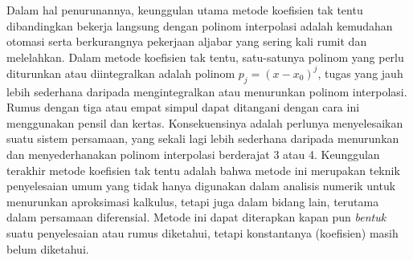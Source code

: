Dalam hal penurunannya, keunggulan utama metode koefisien tak tentu
dibandingkan bekerja langsung dengan polinom interpolasi adalah kemudahan
otomasi serta berkurangnya pekerjaan aljabar yang sering kali rumit
dan melelahkan. Dalam metode koefisien tak tentu, satu-satunya polinom
yang perlu diturunkan atau diintegralkan adalah polinom $p_{j}=(x-x_{0})^{j}$,
tugas yang jauh lebih sederhana daripada mengintegralkan atau menurunkan
polinom interpolasi. Rumus dengan tiga atau empat simpul dapat ditangani
dengan cara ini menggunakan pensil dan kertas. Konsekuensinya adalah
perlunya menyelesaikan suatu sistem persamaan, yang sekali lagi lebih
sederhana daripada menurunkan dan menyederhanakan polinom interpolasi
berderajat 3 atau 4. Keunggulan terakhir metode koefisien tak tentu
adalah bahwa metode ini merupakan teknik penyelesaian umum yang tidak
hanya digunakan dalam analisis numerik untuk menurunkan aproksimasi
kalkulus, tetapi juga dalam bidang lain, terutama dalam persamaan
diferensial. Metode ini dapat diterapkan kapan pun \textit{bentuk}
suatu penyelesaian atau rumus diketahui, tetapi konstantanya (koefisien)
masih belum diketahui.

